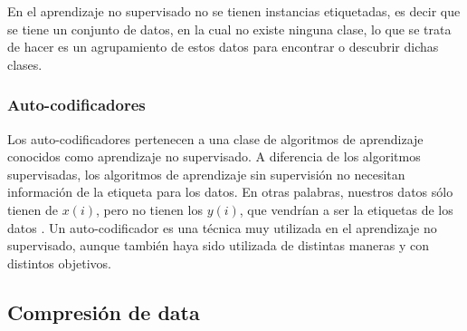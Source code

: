 En el aprendizaje no supervisado no se tienen instancias etiquetadas, es decir que se tiene un conjunto de datos, en la cual no existe ninguna clase, lo que se trata de hacer es un agrupamiento de estos datos para encontrar o descubrir dichas clases.

\subsubsection{Auto-codificadores}\label{sec:autoencoders}

    Los auto-codificadores pertenecen a una clase de algoritmos de aprendizaje conocidos como aprendizaje no supervisado. A diferencia de los algoritmos supervisadas, los algoritmos de aprendizaje sin supervisión no necesitan información de la etiqueta para los datos. En otras palabras, nuestros datos sólo tienen de $x(i)$, pero no tienen los $y(i)$, que vendrían a ser la etiquetas de los datos \cite{Le15atutorial, website:UFLDL}. Un auto-codificador es una técnica muy utilizada en el aprendizaje no supervisado, aunque también haya sido utilizada de distintas maneras y con distintos objetivos.

    \subsection{Compresión de data}

